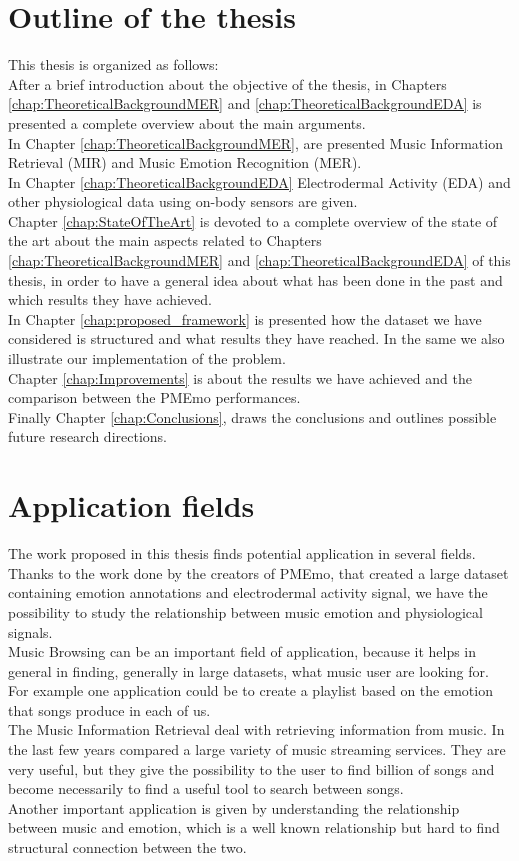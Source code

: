 \section{Outline of the thesis}
This thesis is organized as follows:
\\ \indent
After a brief introduction about the objective of the thesis, in Chapters \ref{chap:TheoreticalBackgroundMER} and \ref{chap:TheoreticalBackgroundEDA} is presented a complete overview about the main arguments.
\\
In Chapter \ref{chap:TheoreticalBackgroundMER}, are presented Music Information Retrieval (MIR) and Music Emotion Recognition (MER).
\\
In Chapter \ref{chap:TheoreticalBackgroundEDA} Electrodermal Activity (EDA) and other physiological data using on-body sensors are given.
\\ \indent
Chapter \ref{chap:StateOfTheArt} is devoted to a complete overview of the state of the art about the main aspects related to Chapters \ref{chap:TheoreticalBackgroundMER} and \ref{chap:TheoreticalBackgroundEDA} of this thesis, in order to have a general idea about what has been done in the past and which results they have achieved.
\\ \indent
In Chapter \ref{chap:proposed_framework} is presented how the dataset we have considered is structured and what results they have reached. In the same  we also illustrate our implementation of the problem.
\\ \indent
Chapter \ref{chap:Improvements} is about the results we have achieved and the comparison between the PMEmo performances.
\\ \indent
Finally Chapter \ref{chap:Conclusions}, draws the conclusions and outlines possible future research directions.

\section{Application fields}
\indent
The work proposed in this thesis finds potential application in several fields. Thanks to the work done by the creators of PMEmo, that created a large dataset containing emotion annotations and electrodermal activity signal, we have the possibility to study the relationship between music emotion and physiological signals.
\\
Music Browsing can be an important field of application, because it helps in general in finding, generally in large datasets, what music user are looking for. For example one application could be to create a playlist based on the emotion that songs produce in each of us.
\\ \indent
The Music Information Retrieval deal with retrieving information from music. In the last few years compared a large variety of music streaming services. They are very useful, but they give the possibility to the user to find billion of songs and become necessarily to find a useful tool to search between songs. 
\\ \indent
Another important application is given by understanding the relationship between music and emotion, which is a well known relationship but hard to find structural connection between the two.